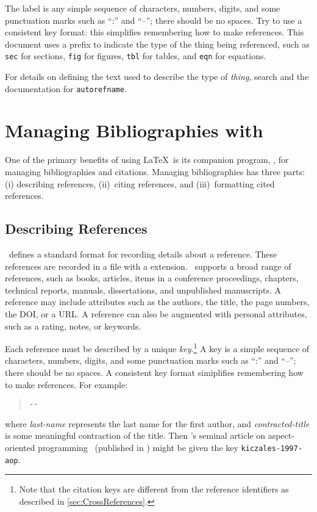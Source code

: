 The label is any simple sequence of characters, numbers, digits,
and some punctuation marks such as ``:'' and ``--''; there should
be no spaces.  Try to use a consistent key format: this simplifies
remembering how to make references.  This document uses a prefix
to indicate the type of the thing being referenced, such as \texttt{sec}
for sections, \texttt{fig} for figures, \texttt{tbl} for tables,
and \texttt{eqn} for equations.

For details on defining the text used to describe the type
of \emph{thing}, search  and the 
documentation for \texttt{autorefname}.


\section{Managing Bibliographies with \BibTeX}
\label{sec:BibTeX}

One of the primary benefits of using \LaTeX\ is its companion program,
\BibTeX, for managing bibliographies and citations.  Managing
bibliographies has three parts: (i) describing references,
(ii)~citing references, and (iii)~formatting cited references.

\subsection{Describing References}

\BibTeX\ defines a standard format for recording details about a
reference.  These references are recorded in a file with a
 extension.  \BibTeX\ supports a broad range of
references, such as books, articles, items in a conference proceedings,
chapters, technical reports, manuals, dissertations, and unpublished
manuscripts. 
A reference may include attributes such as the authors,
the title, the page numbers, the \ac{DOI}, or a \ac{URL}.  A reference
can also be augmented with personal attributes, such as a rating,
notes, or keywords.

Each reference must be described by a unique \emph{key}.\footnote{%
	Note that the citation keys are different from the reference
	identifiers as described in \autoref{sec:CrossReferences}.}
A key is a simple sequence of characters, numbers, digits, and some
punctuation marks such as ``:'' and ``--''; there should be no spaces. 
A consistent key format simiplifies remembering how to make references. 
For example:
\begin{quote}
	\texttt{-}\texttt{-}
\end{quote}
where \emph{last-name} represents the last name for the first author,
and \emph{contracted-title} is some meaningful contraction of the
title.  Then \citeauthor{kiczales-1997-aop}'s seminal article on
aspect-oriented programming~\cite{kiczales-1997-aop} (published in
\citeyear{kiczales-1997-aop}) might be given the key
\texttt{kiczales-1997-aop}.

